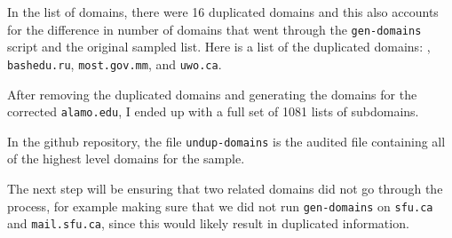 \documentclass{article}
\theoremstyle{definition}
\begin{document}
\begin{flushleft}
In the list of domains, there were 16 duplicated domains and this
also accounts for the difference in number of domains that went
through the \texttt{gen-domains} script and the original sampled
list. Here is a list of the duplicated domains: ,
\texttt{bashedu.ru}, \texttt{most.gov.mm}, and \texttt{uwo.ca}.

After removing the duplicated domains and generating the domains
for the corrected \texttt{alamo.edu}, I ended up with a full set
of 1081 lists of subdomains.

In the github repository, the file \texttt{undup-domains} is the audited file containing all
of the highest level domains for the sample.

The next step will be ensuring that two related domains did not go through
the process, for example making sure that we did not run \texttt{gen-domains}
on \texttt{sfu.ca} and \texttt{mail.sfu.ca}, since this would likely result in
duplicated information.



\end{flushleft}
\printbibliography
\end{document}
